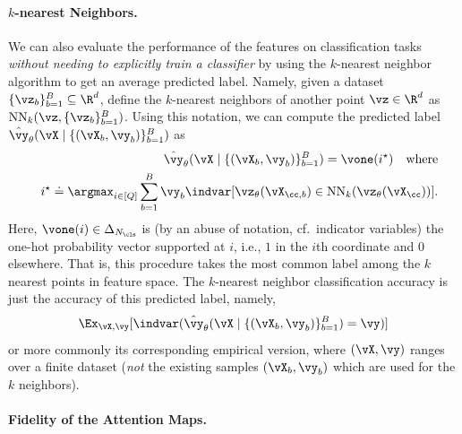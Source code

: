 \documentclass[../../book-main.tex]{subfiles}
\begin{document}
\paragraph{\(k\)-nearest Neighbors.}  We can also evaluate the
performance of the features on classification tasks \textit{without
needing to explicitly train a classifier} by using the \(k\)-nearest
neighbor algorithm to get an average predicted label. Namely, given a
dataset \(\{\vz_{b}\}_{b = 1}^{B} \subseteq \R^{d}\), define the
\(k\)-nearest neighbors of another point \(\vz \in \R^{d}\) as
\(\operatorname{NN}_{k}(\vz, \{\vz_{b}\}_{b = 1}^{B})\). Using this
notation, we can compute the predicted label \(\hat{\vy}_{\theta}(\vX
\mid \{(\vX_{b}, \vy_{b})\}_{b = 1}^{B})\) as
\begin{eqnarray}
&&\hat{\vy}_{\theta}(\vX \mid \{(\vX_{b}, \vy_{b})\}_{b = 1}^{B}) =
\vone(i^{\star}) \quad \text{where} \nonumber \\
&& i^{\star} \doteq \argmax_{i \in [Q]}\sum_{b =
1}^{B}\vy_{b}\indvar[\vz_{\theta}(\vX_{\cc, b}) \in
\operatorname{NN}_{k}(\vz_{\theta}(\vX_{\cc}))].
\end{eqnarray}
Here, \(\vone(i) \in \Delta_{N_{\cls}}\) is (by an abuse of notation,
cf.~indicator variables) the one-hot probability vector supported at
\(i\), i.e., \(1\) in the \(i\)th coordinate and \(0\) elsewhere.
That is, this procedure takes the most common label among the \(k\)
nearest points in feature space. The \(k\)-nearest neighbor
classification accuracy is just the accuracy of this predicted label, namely,
\begin{equation}
\Ex_{\vX, \vy}[\indvar(\hat{\vy}_{\theta}(\vX \mid \{(\vX_{b},
\vy_{b})\}_{b = 1}^{B}) = \vy)]
\end{equation}
or more commonly its corresponding empirical version, where \((\vX,
\vy)\) ranges over a finite dataset (\textit{not} the existing
samples \((\vX_{b}, \vy_{b})\) which are used for the \(k\) neighbors).

\paragraph{Fidelity of the Attention Maps.}
\end{document}
